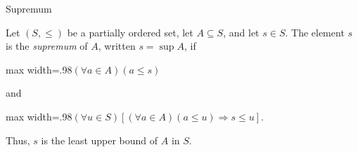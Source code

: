 \begin{definitionbox}{Supremum}
\begin{definition*}[Supremum]

Let $(S,\leq)$ be a partially ordered set, let $A\subseteq S$, and let
$s\in S$. The element $s$ is the \emph{supremum} of $A$, written
$s=\sup A$, if
\begin{center}\begin{adjustbox}{max width=.98\linewidth}$\displaystyle (\forall a\in A)(a\leq s)$\end{adjustbox}\end{center}
and
\begin{center}\begin{adjustbox}{max width=.98\linewidth}$\displaystyle (\forall u\in S) \left[ (\forall a\in A)(a\leq u) \Longrightarrow s\leq u \right].$\end{adjustbox}\end{center}
Thus, $s$ is the least upper bound of $A$ in $S$.
\end{definition*}
\end{definitionbox}
